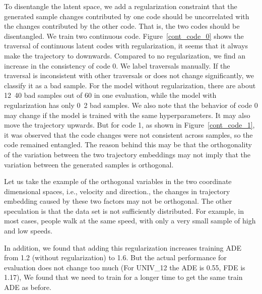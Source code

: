 To disentangle the latent space, we add a regularization constraint that the generated sample changes contributed by one code should be uncorrelated with the changes contributed by the other code. That is, the two codes should be disentangled. We train two continuous code. Figure~\ref{cont_code_0} shows the traversal of continuous latent codes with regularization, it seems that it always make the trajectory to downwards. Compared to no regularization, we find an increase in the consistency of code 0. We label traversals manually. If the traversal is inconsistent with other traversals or does not change significantly, we classify it as a bad sample. For the model without regularization, there are about 12~40 bad samples out of 60 in one evaluation, while the model with regularization has only 0~2 bad samples. We also note that the behavior of code 0 may change if the model is trained with the same hyperparameters. It may also move the trajectory upwards. But for code 1, as shown in Figure~\ref{cont_code_1}, it was observed that the code changes were not consistent across samples, so the code remained entangled. The reason behind this may be that the orthogonality of the variation between the two trajectory embeddings may not imply that the variation between the generated samples is orthogonal.

Let us take the example of the orthogonal variables in the two coordinate dimensional spaces, i.e., velocity and direction., the changes in trajectory embedding caused by these two factors may not be orthogonal. The other speculation is that the data set is not sufficiently distributed. For example, in most cases, people walk at the same speed, with only a very small sample of high and low speeds.

In addition, we found that adding this regularization increases training ADE from 1.2 (without regularization) to 1.6. But the actual performance for evaluation does not change too much (For UNIV\_12 the ADE is 0.55, FDE is 1.17), We found that we need to train for a longer time to get the same train ADE as before.

